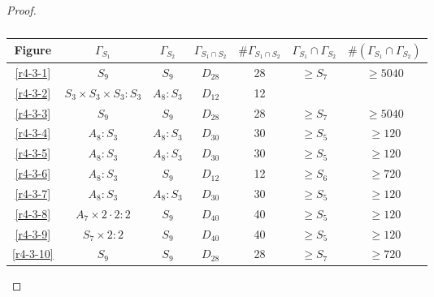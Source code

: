 \begin{proof}
  \begin{table}
    \centering
    \begin{tabular}{|c|c|c|c|c|c|c|}
      \hline
      Figure & $\Gamma_{S_1}$ & $\Gamma_{S_2}$ & $\Gamma_{S_1 \cap S_2}$ & $\#\Gamma_{S_1 \cap S_2}$ & $\Gamma_{S_1} \cap \Gamma_{S_2}$ & $\#(\Gamma_{S_1} \cap \Gamma_{S_2})$ \\ \hline

      \ref{r4-3-1} & $S_9$ & $S_9$ & $D_{28}$ & 28 & $\ge S_7$ & $\ge 5040$ \\ \hline
      \ref{r4-3-2} & $S_3 \times S_3 \times S_3:S_3$ & $A_8 : S_3$ & $D_{12}$ & 12 & & \\ \hline
      \ref{r4-3-3} & $S_9$ & $S_9$ & $D_{28}$ & 28 & $\ge S_7$ & $\ge 5040$ \\ \hline
      \ref{r4-3-4} & $A_8 : S_3$ & $A_8 : S_3$ & $D_{30}$ & 30 & $\ge S_5$ & $\ge 120$ \\ \hline
      \ref{r4-3-5} & $A_8 : S_3$ & $A_8 : S_3$ & $D_{30}$ & 30 & $\ge S_5$ & $\ge 120$ \\ \hline
      \ref{r4-3-6} & $A_8 : S_3$ & $S_9$ & $D_{12}$ & 12 & $\ge S_6$ & $\ge 720$ \\ \hline
      \ref{r4-3-7} & $A_8 : S_3$ & $A_8 : S_3$ & $D_{30}$ & 30 & $\ge S_5$ & $\ge 120$  \\ \hline
      \ref{r4-3-8} & $A_7 \times 2 \cdot 2 : 2$ & $S_9$ & $D_{40}$ & 40 & $\ge S_5$ & $\ge 120$ \\ \hline
      \ref{r4-3-9} & $S_7 \times 2:2$ & $S_9$ & $D_{40}$ & 40 & $\ge S_5$ & $\ge 120$ \\ \hline
      \ref{r4-3-10}& $S_9$ & $S_9$ & $D_{28}$ & 28 & $\ge S_7$ & $\ge 720$ \\ \hline

    \end{tabular}
    \caption{}
    \label{results-2-3}
  \end{table}

\end{proof}
